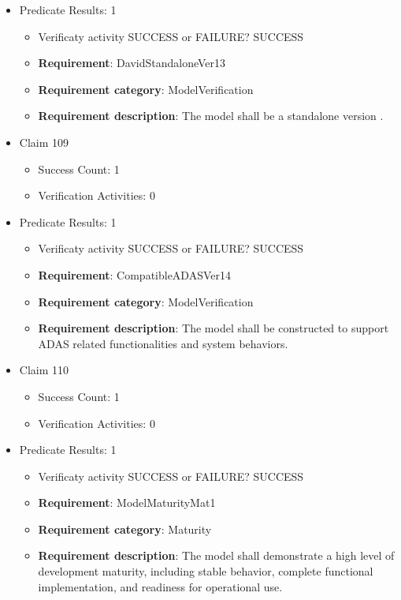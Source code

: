\documentclass{article}
\begin{document}
\begin{itemize}
									    
				\item Predicate Results: 1
					\begin{itemize}				
					\item Verificaty activity SUCCESS or FAILURE? SUCCESS
					
					\item \textbf{Requirement}: DavidStandaloneVer13 
					\item \textbf{Requirement category}: ModelVerification
					\item \textbf{Requirement description}: The model shall be a standalone version .
					\end{itemize}

  				  \item Claim 109
				\begin{itemize}
			    	\item Success Count: 1 
			    	\item Verification Activities: 0
				\end{itemize}
				
									    
				\item Predicate Results: 1
					\begin{itemize}				
					\item Verificaty activity SUCCESS or FAILURE? SUCCESS
					
					\item \textbf{Requirement}: CompatibleADASVer14 
					\item \textbf{Requirement category}: ModelVerification
					\item \textbf{Requirement description}: The model shall be constructed to support ADAS related functionalities and system behaviors.
					\end{itemize}

  				  \item Claim 110
				\begin{itemize}
			    	\item Success Count: 1 
			    	\item Verification Activities: 0
				\end{itemize}
				
									    
				\item Predicate Results: 1
					\begin{itemize}				
					\item Verificaty activity SUCCESS or FAILURE? SUCCESS
					
					\item \textbf{Requirement}: ModelMaturityMat1 
					\item \textbf{Requirement category}: Maturity
					\item \textbf{Requirement description}: The model shall demonstrate a high level of development maturity, including stable behavior, complete functional implementation, and readiness for operational use.
					\end{itemize}


\end{itemize}
\end{document}
